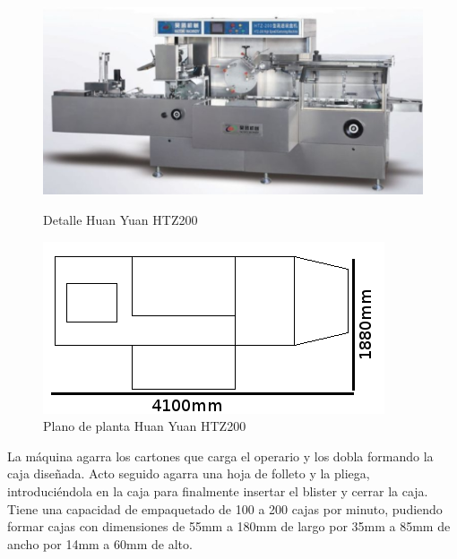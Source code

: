 	\begin{figure}[htp]
		\begin{minipage}{.48\textwidth}
			\centering
			\includegraphics[scale=0.4]{Datasheets/7Foto.png}
			\caption{Detalle Huan Yuan HTZ200}
			\label{fig:testa}
		\end{minipage}
		\begin{minipage}{.48\textwidth}
			\centering
			\includegraphics[scale=0.5]{Datasheets/Miniaturas/empaquetar.png}
			\caption{Plano de planta Huan Yuan HTZ200}
			\label{fig:testb}
		\end{minipage}
	\end{figure}

	

	La máquina agarra los cartones que carga el operario y los dobla formando la caja diseñada. Acto seguido agarra una hoja de folleto y la pliega, introduciéndola en la caja para finalmente insertar el blister y cerrar la caja.\\

	Tiene una capacidad de empaquetado de 100 a 200 cajas por minuto, pudiendo formar cajas con dimensiones de 55mm a 180mm de largo por 35mm a 85mm de ancho por 14mm a 60mm de alto.


